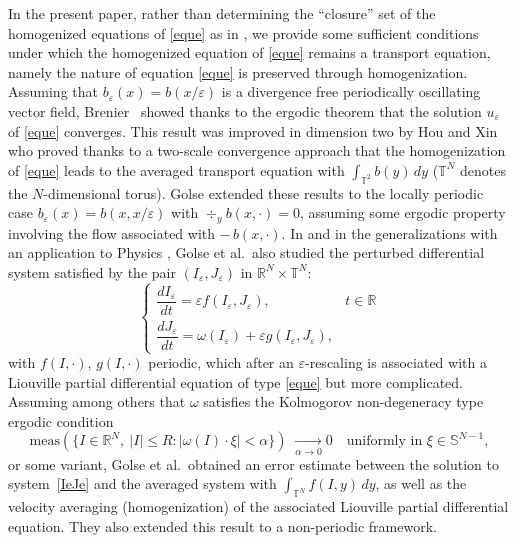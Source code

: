 \documentclass[JEP,XML,SOM,Unicode]{cedram}
\let\al\alpha
\def \RR {\mathbb R}
\def \Ss {\mathbb S}
\def \TT {\mathbb T}
\theoremstyle{plain}
\theoremstyle{definition}
\begin{document}
In the present paper, rather than determining the ``closure'' set of the homogenized equations of \eqref{eque} as in \cite{AHZ1,AHZ2,AHZ3}, we provide some sufficient conditions under which the homogenized equation of \eqref{eque} remains a transport equation, namely the nature of equation \eqref{eque} is preserved through homogenization.
Assuming that $b_\varepsilon(x)=b(x/\varepsilon)$ is a divergence free periodically oscillating vector field, Brenier~\cite{Bre} showed thanks to the ergodic theorem that the solution $u_\varepsilon$ of \eqref{eque} converges. This result was improved in dimension two by Hou and Xin \cite{HoXi} who proved thanks to a two-scale convergence approach that the homogenization of \eqref{eque} leads to the averaged transport equation with $\int_{\TT^2}b(y)\,dy$ ($\TT^N$ denotes the $N$-dimensional torus). Golse \cite[Th.\,8]{Gol1} extended these results to the locally periodic case $b_\varepsilon(x)=b(x,x/\varepsilon)$ with $\div_yb(x,\cdot)=0$, assuming some ergodic property involving the flow associated with $-\,b(x,\cdot)$. In \cite{Gol1,Gol2} and in the generalizations \cite{DGL,DuGo} with an application to Physics \cite{DEG}, Golse et al.\ also studied the perturbed differential system satisfied by the pair $(I_\varepsilon,J_\varepsilon)$ in $\RR^N\times\TT^N$:
\begin{equation}\label{IeJe}
\begin{cases}
\dfrac{d I_\varepsilon}{dt}=\varepsilon f(I_\varepsilon,J_\varepsilon), & t\in\RR
\\[8pt]
\dfrac{d J_\varepsilon}{dt}=\omega(I_\varepsilon)+\varepsilon g(I_\varepsilon,J_\varepsilon),
\end{cases}
\end{equation}
with $f(I,\cdot)$, $g(I,\cdot)$ periodic, which after an $\varepsilon$-rescaling is associated with a Liouville partial differential equation of type \eqref{eque} but more complicated. Assuming among others that $\omega$ satisfies the Kolmogorov non-degeneracy type ergodic condition
\begin{equation}\label{ergK}
\mbox{meas}\left(\big\{I\in\RR^N,\ |I|\leq R:|\omega(I)\cdot\xi|<\al\big\}\right)\;\xrightarrow[\al\to 0]\; 0\quad\mbox{uniformly in }\xi\in\Ss^{N-1},
\end{equation}
or some variant, Golse et al.\ obtained an error estimate between the solution to system~\eqref{IeJe} and the averaged system with $\int_{\TT^N}f(I,y)\,dy$, as well as the velocity averaging (homogenization) of the associated Liouville partial differential equation. They also extended this result to a non-periodic framework.
\end{document}
